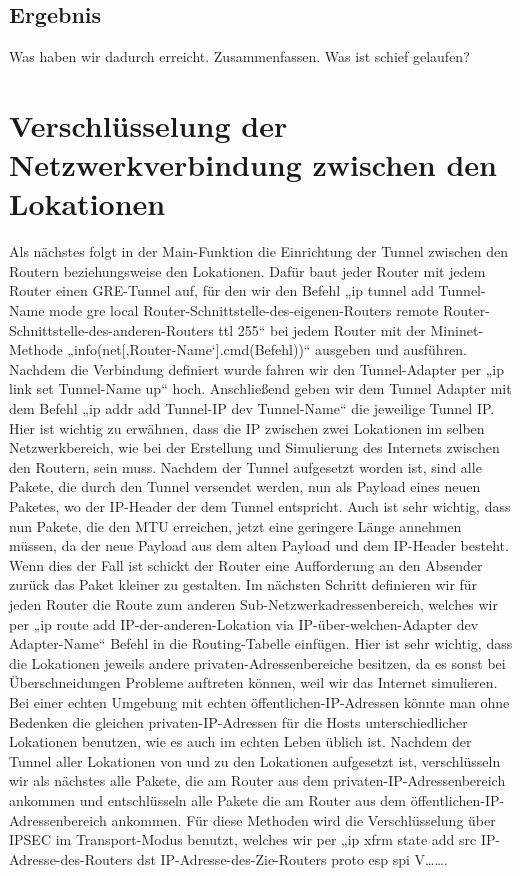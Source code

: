\documentclass[fontsize=12pt,paper=a4,open=any,parskip=half,
  twoside=false,toc=listof,toc=bibliography,fleqn,leqno,
  captions=nooneline,captions=tableabove,british]{scrbook}
\begin{document}
\subsection{Ergebnis}
Was haben wir dadurch erreicht. Zusammenfassen.
Was ist schief gelaufen?

\section{Verschlüsselung der Netzwerkverbindung zwischen den Lokationen}
Als nächstes folgt in der Main-Funktion die Einrichtung der Tunnel zwischen den Routern beziehungsweise den Lokationen. Dafür baut jeder Router mit jedem Router einen GRE-Tunnel auf, für den wir den Befehl „ip tunnel add Tunnel-Name mode gre local Router-Schnittstelle-des-eigenen-Routers remote Router-Schnittstelle-des-anderen-Routers ttl 255“ bei jedem Router mit der Mininet-Methode „info(net[‚Router-Name‘].cmd(Befehl))“ ausgeben und ausführen. Nachdem die Verbindung definiert wurde fahren wir den Tunnel-Adapter per „ip link set Tunnel-Name up“ hoch. Anschließend geben wir dem Tunnel Adapter mit dem Befehl „ip addr add Tunnel-IP dev Tunnel-Name“ die jeweilige Tunnel IP. Hier ist wichtig zu erwähnen, dass die IP zwischen zwei Lokationen im selben Netzwerkbereich, wie bei der Erstellung und Simulierung des Internets zwischen den Routern, sein muss. Nachdem der Tunnel aufgesetzt worden ist, sind alle Pakete, die durch den Tunnel versendet werden, nun als Payload eines neuen Paketes, wo der IP-Header der dem Tunnel entspricht. Auch ist sehr wichtig, dass nun Pakete, die den MTU erreichen, jetzt eine geringere Länge annehmen müssen, da der neue Payload aus dem alten Payload und dem IP-Header besteht. Wenn dies der Fall ist schickt der Router eine Aufforderung an den Absender zurück das Paket kleiner zu gestalten.
Im nächsten Schritt definieren wir für jeden Router die Route zum anderen Sub-Netzwerkadressenbereich, welches wir per „ip route add IP-der-anderen-Lokation via IP-über-welchen-Adapter dev Adapter-Name“ Befehl in die Routing-Tabelle einfügen. Hier ist sehr wichtig, dass die Lokationen jeweils andere privaten-Adressenbereiche besitzen, da es sonst bei Überschneidungen Probleme auftreten können, weil wir das Internet simulieren. Bei einer echten Umgebung mit echten öffentlichen-IP-Adressen könnte man ohne Bedenken die gleichen privaten-IP-Adressen für die Hosts unterschiedlicher Lokationen benutzen, wie es auch im echten Leben üblich ist.
Nachdem der Tunnel aller Lokationen von und zu den Lokationen aufgesetzt ist, verschlüsseln wir als nächstes alle Pakete, die am Router aus dem privaten-IP-Adressenbereich ankommen und entschlüsseln alle Pakete die am Router aus dem öffentlichen-IP-Adressenbereich ankommen. Für diese Methoden wird die Verschlüsselung über IPSEC im Transport-Modus benutzt, welches wir per „ip xfrm state add src IP-Adresse-des-Routers dst IP-Adresse-des-Zie-Routers proto esp spi V……. 
\end{document}
